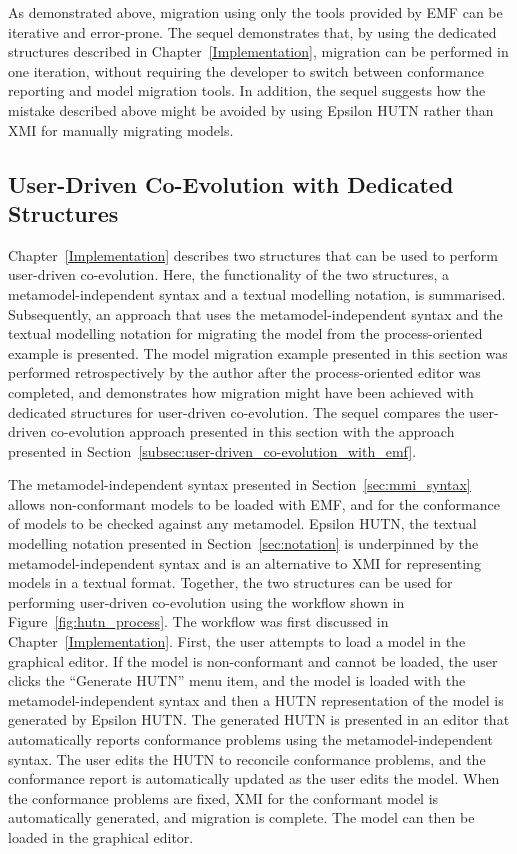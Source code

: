 As demonstrated above, migration using only the tools provided by EMF can be iterative and error-prone. The sequel demonstrates that, by using the dedicated structures described in Chapter~\ref{Implementation}, migration can be performed in one iteration, without requiring the developer to switch between conformance reporting and model migration tools. In addition, the sequel suggests how the mistake described above might be avoided by using Epsilon HUTN rather than XMI for manually migrating models.

\subsection{User-Driven Co-Evolution with Dedicated Structures}
\label{subsec:user-driven_co-evolution_with_dedicated_structures}

Chapter~\ref{Implementation} describes two structures that can be used to perform user-driven co-evolution. Here, the functionality of the two structures, a metamodel-independent syntax and a textual modelling notation, is summarised. Subsequently, an approach that uses the metamodel-independent syntax and the textual modelling notation for migrating the model from the process-oriented example is presented. The model migration example presented in this section was performed retrospectively by the author after the process-oriented editor was completed, and demonstrates how migration might have been achieved with dedicated structures for user-driven co-evolution. The sequel compares the user-driven co-evolution approach presented in this section with the approach presented in Section~\ref{subsec:user-driven_co-evolution_with_emf}.

The metamodel-independent syntax presented in Section~\ref{sec:mmi_syntax} allows non-conformant models to be loaded with EMF, and for the conformance of models to be checked against any metamodel. Epsilon HUTN, the textual modelling notation presented in Section~\ref{sec:notation} is underpinned by  the metamodel-independent syntax and is an alternative to XMI for representing models in a textual format. Together, the two structures can be used for performing user-driven co-evolution using the workflow shown in Figure~\ref{fig:hutn_process}. The workflow was first discussed in Chapter~\ref{Implementation}. First, the user attempts to load a model in the graphical editor. If the model is non-conformant and cannot be loaded, the user clicks the ``Generate HUTN'' menu item, and the model is loaded with the metamodel-independent syntax and then a HUTN representation of the model is generated by Epsilon HUTN. The generated HUTN is presented in an editor that automatically reports conformance problems using the metamodel-independent syntax. The user edits the HUTN to reconcile conformance problems, and the conformance report is automatically updated as the user edits the model. When the conformance problems are fixed, XMI for the conformant model is automatically generated, and migration is complete. The model can then be loaded in the graphical editor.


